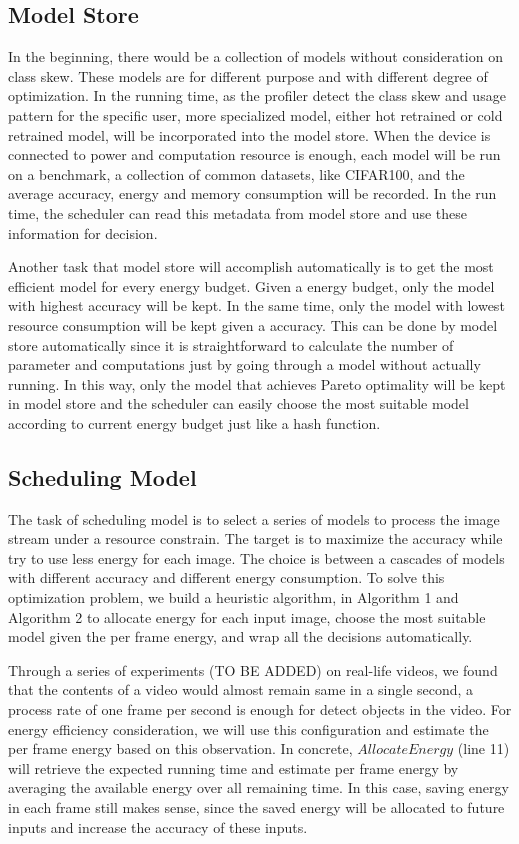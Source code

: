 \documentclass[conference]{IEEEtran}
\begin{document}
\begin{spacing}{0.9}
\subsection{Model Store}
In the beginning, there would be a collection of models without consideration on class skew. These models are for different purpose and with different degree of optimization. In the running time, as the profiler detect the class skew and usage pattern for the specific user, more specialized model, either hot retrained or cold retrained model, will be incorporated into the model store. When the device is connected to power and computation resource is enough, each model will be run on a benchmark, a collection of common datasets, like CIFAR100, and the average accuracy, energy and memory consumption will be recorded. In the run time, the scheduler can read this metadata from model store and use these information for decision. 

Another task that model store will accomplish automatically is to get the most efficient model for every energy budget. Given a energy budget, only the model with highest accuracy will be kept. In the same time, only the model with lowest resource consumption will be kept given a accuracy. This can be done by model store automatically since it is straightforward to calculate the number of parameter and computations just by going through a model without actually running. In this way, only the model that achieves Pareto optimality will be kept in model store and the scheduler can easily choose the most suitable model according to current energy budget just like a hash function.


\subsection{Scheduling Model}
The task of scheduling model is to select a series of models to process the image stream under a resource constrain. The target is to maximize the accuracy while try to use less energy for each image. The choice is between a cascades of models with different accuracy and different energy consumption. To solve this optimization problem, we build a heuristic algorithm, in Algorithm 1 and Algorithm 2 to allocate energy for each input image, choose the most suitable model given the per frame energy, and wrap all the decisions automatically.


Through a series of experiments (TO BE ADDED) on real-life videos, we found that the contents of a video would almost remain same in a single second, a process rate of one frame per second is enough for detect objects in the video. For energy efficiency consideration, we will use this configuration and estimate the per frame energy based on this observation. In concrete, $AllocateEnergy$ (line 11) will retrieve the expected running time and estimate per frame energy by averaging the available energy over all remaining time. In this case, saving energy in each frame still makes sense, since the saved energy will be allocated to future inputs and increase the accuracy of these inputs.


\end{spacing}
\end{document}
